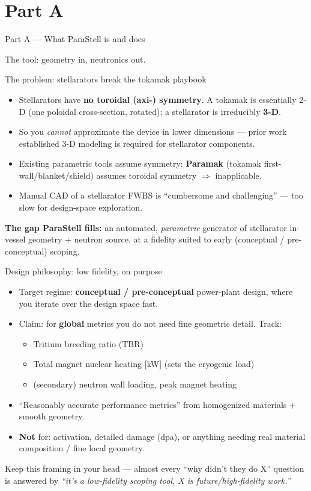 \documentclass[aspectratio=169]{beamer}
\newcommand{\kb}[1]{\begin{tcolorbox}[colback=key!5,colframe=key!60,boxsep=2pt,left=4pt,right=4pt,top=3pt,bottom=3pt]#1\end{tcolorbox}}
\newcommand{\wb}[1]{\begin{tcolorbox}[colback=warn!5,colframe=warn!55,boxsep=2pt,left=4pt,right=4pt,top=3pt,bottom=3pt]#1\end{tcolorbox}}
\begin{document}
\section{Part A}
\begin{frame}{Part A --- What ParaStell is and does}
  \begin{center}\Large\color{key} The tool: geometry in, neutronics out.\end{center}
\end{frame}

\begin{frame}{The problem: stellarators break the tokamak playbook}
  \begin{itemize}
    \item Stellarators have \textbf{no toroidal (axi-) symmetry}. A tokamak is essentially 2-D (one poloidal cross-section, rotated); a stellarator is irreducibly \textbf{3-D}.
    \item So you \emph{cannot} approximate the device in lower dimensions --- prior work established 3-D modeling is required for stellarator components.
    \item Existing parametric tools assume symmetry: \textbf{Paramak} (tokamak first-wall/blanket/shield) assumes toroidal symmetry $\Rightarrow$ inapplicable.
    \item Manual CAD of a stellarator FWBS is ``cumbersome and challenging'' --- too slow for design-space exploration.
  \end{itemize}
  \kb{\textbf{The gap ParaStell fills:} an automated, \emph{parametric} generator of stellarator in-vessel geometry + neutron source, at a fidelity suited to early (conceptual / pre-conceptual) scoping.}
\end{frame}

\begin{frame}{Design philosophy: low fidelity, on purpose}
  \begin{itemize}
    \item Target regime: \textbf{conceptual / pre-conceptual} power-plant design, where you iterate over the design space fast.
    \item Claim: for \textbf{global} metrics you do not need fine geometric detail. Track:
      \begin{itemize}\small
        \item Tritium breeding ratio (TBR)
        \item Total magnet nuclear heating [kW] (sets the cryogenic load)
        \item (secondary) neutron wall loading, peak magnet heating
      \end{itemize}
    \item ``Reasonably accurate performance metrics'' from homogenized materials + smooth geometry.
    \item \textbf{Not} for: activation, detailed damage (dpa), or anything needing real material composition / fine local geometry.
  \end{itemize}
  \wb{Keep this framing in your head --- almost every ``why didn't they do X'' question is answered by \emph{``it's a low-fidelity scoping tool, X is future/high-fidelity work.''}}
\end{frame}
\end{document}
